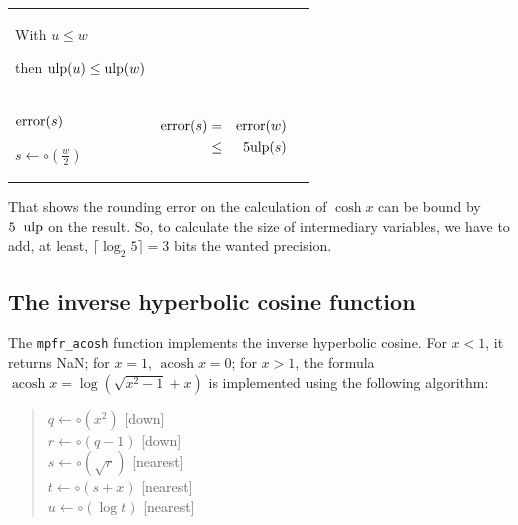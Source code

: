 \documentclass[12pt]{amsart}
\DeclareMathOperator{\acosh}{acosh}
\def\ulp{{\rm ulp}}
\begin{document}
\begin{center}
\begin{tabular}{l l l}
\begin{minipage}{6cm}
With $u \leq w$

then $\ulp(u) \leq \ulp(w)$

\end{minipage}\\%
\begin{minipage}{2.5cm}
${\textnormal{error}}(s)$

$s \leftarrow \circ(\frac{w}{2}) $
\end{minipage} &
\begin{minipage}{7.5cm}

\begin{center}


\begin{eqnarray}\nonumber
 {\textnormal{error}}(s) & = &  {\textnormal{error}}(w)\\\nonumber
 & \leq &  5\ulp(s)
\end{eqnarray}



\end{center}

\end{minipage} &
\begin{minipage}{6cm}


\end{minipage}


\end{tabular}
\end{center}

That shows the rounding error on the calculation of $\cosh x$ can be
bound by $5 \;\; \ulp$ on the result. So, to calculate the size of
intermediary variables, we have to add, at least, $\lceil \log_2 5 \rceil=3$ bits the wanted
precision.

\subsection{The inverse hyperbolic cosine function}

The {\tt mpfr\_acosh} function implements the inverse hyperbolic
cosine. For $x < 1$, it returns NaN; for $x=1$, $\acosh x = 0$;
for $x > 1$, the formula $\acosh x = \log ( \sqrt{x^2-1} + x )$
is implemented using the following algorithm:
\begin{quote}
$q \leftarrow \circ(x^2)$ [down] \\
$r \leftarrow \circ(q-1)$ [down] \\
$s \leftarrow \circ(\sqrt{r})$ [nearest] \\
$t \leftarrow \circ(s + x)$ [nearest] \\
$u \leftarrow \circ(\log t)$ [nearest]
\end{quote}
\end{document}
